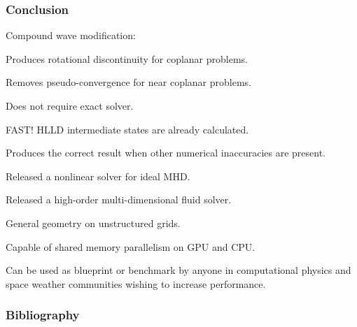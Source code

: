 \documentclass{beamer}
\begin{document}

\begin{frame}[fragile]
\frametitle{Conclusion}
\bei
\item Compound wave modification:
\bei
\item Produces rotational discontinuity for coplanar problems.
\item Removes pseudo-convergence for near coplanar problems.
\item Does not require exact solver.
\item FAST! HLLD intermediate states are already calculated.
\item Produces the correct result when other numerical inaccuracies are present.
\ebi
\item Released a nonlinear solver for ideal MHD.  
\item Released a high-order multi-dimensional fluid solver.  
\bei 
\item General geometry on unstructured grids. 
\item Capable of shared memory parallelism on GPU and CPU.
\item Can be used as blueprint or benchmark by anyone in computational physics and space weather communities wishing to increase performance. 
\ebi
\ebi
\end{frame}

\begin{frame}[allowframebreaks]
\frametitle{Bibliography}
\printbibliography	%
\end{frame}
\end{document}
